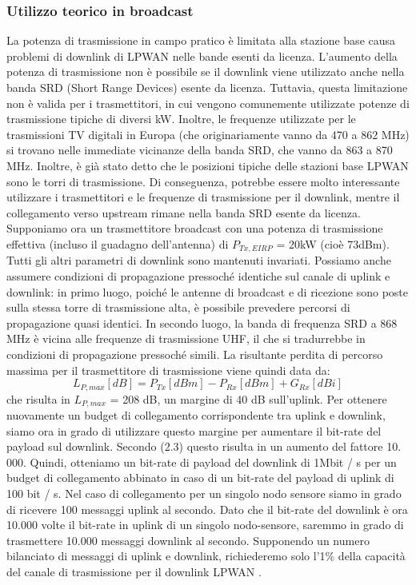 \documentclass[a4paper]{report} %
\begin{document}
\subsubsection{Utilizzo teorico in broadcast}
La potenza di trasmissione in campo pratico è limitata alla stazione base causa problemi di downlink di LPWAN nelle bande esenti da licenza. L'aumento della potenza di trasmissione non è possibile se il downlink viene utilizzato anche nella banda SRD (Short Range Devices) esente da licenza. Tuttavia, questa limitazione non è valida per i trasmettitori, in cui vengono comunemente utilizzate potenze di trasmissione tipiche di diversi kW. Inoltre, le frequenze utilizzate per le trasmissioni TV digitali in Europa (che originariamente vanno da 470 a 862 MHz) si trovano nelle immediate vicinanze della banda SRD, che vanno da 863 a 870 MHz. Inoltre, è già stato detto che le posizioni tipiche delle stazioni base LPWAN sono le torri di trasmissione. Di conseguenza, potrebbe essere molto interessante utilizzare i trasmettitori e le frequenze di trasmissione per il downlink, mentre il collegamento verso upstream rimane nella banda SRD esente da licenza. Supponiamo ora un trasmettitore broadcast con una potenza di trasmissione effettiva (incluso il guadagno dell'antenna) di $P_{Tx, EIRP}$ = 20kW (cioè 73dBm). Tutti gli altri parametri di downlink sono mantenuti invariati. Possiamo anche assumere condizioni di propagazione pressoché identiche sul canale di uplink e downlink: in primo luogo, poiché le antenne di broadcast e di ricezione sono poste sulla stessa torre di trasmissione alta, è possibile prevedere percorsi di propagazione quasi identici. In secondo luogo, la banda di frequenza SRD a 868 MHz è vicina alle frequenze di trasmissione UHF, il che si tradurrebbe in condizioni di propagazione pressoché simili. La risultante perdita di percorso massima per il trasmettitore di trasmissione viene quindi data da:
\begin{equation}
L_{P,max}[dB] = P_{Tx}[dBm]-P_{Rx}[dBm]+G_{Rx}[dBi]  
\end{equation}
che risulta in $L_{P, max}$ = 208 dB, un margine di 40 dB sull'uplink. Per ottenere nuovamente un budget di collegamento corrispondente tra uplink e downlink, siamo ora in grado di utilizzare questo margine per aumentare il bit-rate del payload sul downlink. Secondo (2.3) questo risulta in un aumento del fattore 10. 000. Quindi, otteniamo un bit-rate di payload del downlink di 1Mbit / s per un budget di collegamento abbinato in caso di un bit-rate del payload di uplink di 100 bit / s. Nel caso di collegamento per un singolo nodo sensore siamo in grado di ricevere 100 messaggi uplink al secondo. Dato che il bit-rate del downlink è ora 10.000 volte il bit-rate in uplink di un singolo nodo-sensore, saremmo in grado di trasmettere 10.000 messaggi downlink al secondo. Supponendo un numero bilanciato di messaggi di uplink e downlink, richiederemo solo l'1\% della capacità del canale di trasmissione per il downlink LPWAN \cite{art:rif.40}.
\end{document}
